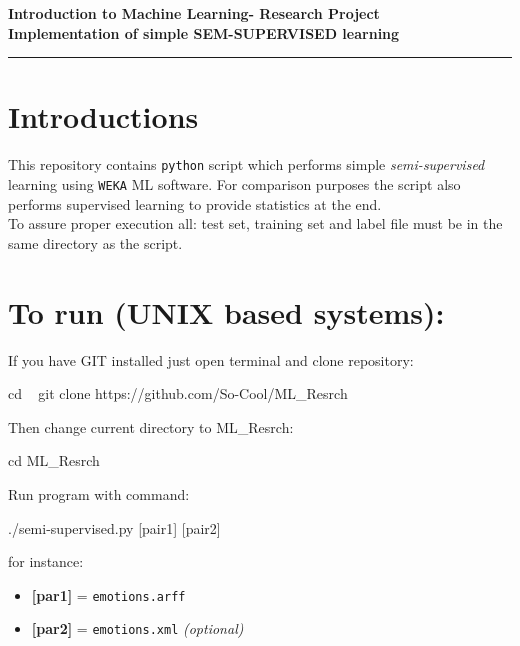 \begin{center}
\textbf{Introduction to Machine Learning- Research Project}\\
\textbf{Implementation of simple SEM-SUPERVISED learning}
\end{center}

\begin{center}\rule{3in}{0.4pt}\end{center}


\section*{Introductions}

This repository contains \texttt{python} script which performs simple \emph{semi-supervised} learning using \texttt{WEKA} ML software. For comparison purposes the script also performs supervised learning to provide statistics at the end.\\
To assure proper execution all: test set, training set and label file must be in the same directory as the script.

\section*{To run (UNIX based systems):}

If you have GIT installed just open terminal and clone repository:

\begin{spverbatim}
cd ~
git clone https://github.com/So-Cool/ML_Resrch
\end{spverbatim}

Then change current directory to ML\_Resrch:

\begin{spverbatim}
cd ML_Resrch
\end{spverbatim}

Run program with command:

\begin{spverbatim}
./semi-supervised.py [pair1] [pair2]
\end{spverbatim}

for instance:

\begin{itemize}
\item \textbf{[par1]} = \texttt{emotions.arff}

\item \textbf{[par2]} = \texttt{emotions.xml} \emph{(optional)}

\end{itemize}

